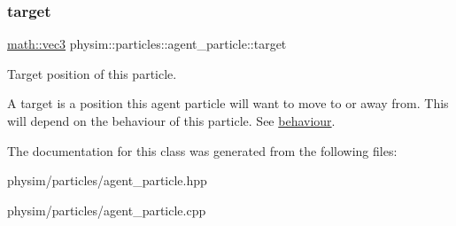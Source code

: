 \subsubsection{\texorpdfstring{target}{target}}
{\footnotesize\ttfamily \hyperlink{structphysim_1_1math_1_1vec3}{math\+::vec3} physim\+::particles\+::agent\+\_\+particle\+::target}



Target position of this particle. 

A target is a position this agent particle will want to move to or away from. This will depend on the behaviour of this particle. See \hyperlink{classphysim_1_1particles_1_1agent__particle_af219e3f46630bb7f51f3d00952ed4f1c}{behaviour}. 

The documentation for this class was generated from the following files\+:\begin{DoxyCompactItemize}
\item 
physim/particles/agent\+\_\+particle.\+hpp\item 
physim/particles/agent\+\_\+particle.\+cpp\end{DoxyCompactItemize}
